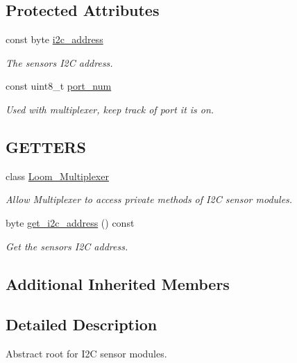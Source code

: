 \subsection*{Protected Attributes}
\begin{DoxyCompactItemize}
\item 
const byte \hyperlink{class_loom_i2_c_sensor_a6ff389c1f015152a9ebfccb037d3d90e}{i2c\+\_\+address}
\begin{DoxyCompactList}\small\item\em The sensor\textquotesingle{}s I2C address. \end{DoxyCompactList}\item 
const uint8\+\_\+t \hyperlink{class_loom_i2_c_sensor_ab5c61951a994a76a2aa2e5400089dad1}{port\+\_\+num}
\begin{DoxyCompactList}\small\item\em Used with multiplexer, keep track of port it is on. \end{DoxyCompactList}\end{DoxyCompactItemize}
\subsection*{G\+E\+T\+T\+E\+RS}
\begin{DoxyCompactItemize}
\item 
class \hyperlink{class_loom_i2_c_sensor_af2e72949edeee6c1a837d695ca3f3302}{Loom\+\_\+\+Multiplexer}
\begin{DoxyCompactList}\small\item\em Allow Multiplexer to access private methods of I2C sensor modules. \end{DoxyCompactList}\item 
byte \hyperlink{class_loom_i2_c_sensor_a22a0afe0a2d1f13cdac37e9208fdce2b}{get\+\_\+i2c\+\_\+address} () const 
\begin{DoxyCompactList}\small\item\em Get the sensor\textquotesingle{}s I2C address. \end{DoxyCompactList}\end{DoxyCompactItemize}
\subsection*{Additional Inherited Members}


\subsection{Detailed Description}
Abstract root for I2C sensor modules. 

